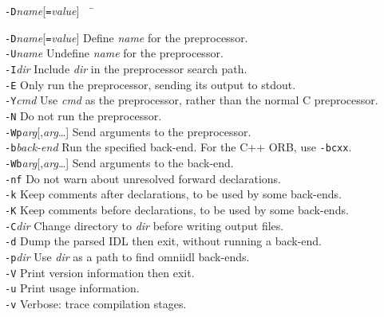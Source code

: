 \documentclass[11pt,twoside,a4paper]{book}
\newcommand{\cmdline}[1]{\texttt{#1}}
\begin{document}
\begin{tabbing}
\cmdline{-D}\textit{name}[\cmdline{=}\textit{value}]~~ \= \kill

\cmdline{-D}\textit{name}[\cmdline{=}\textit{value}]
     \> Define \textit{name} for the preprocessor.\\

\cmdline{-U}\textit{name}
     \> Undefine \textit{name} for the preprocessor.\\

\cmdline{-I}\textit{dir}
     \> Include \textit{dir} in the preprocessor search path.\\

\cmdline{-E}
     \> Only run the preprocessor, sending its output to stdout.\\

\cmdline{-Y}\textit{cmd}
     \> Use \textit{cmd} as the preprocessor, rather than the normal C
        preprocessor.\\

\cmdline{-N}
     \> Do not run the preprocessor.\\

\cmdline{-Wp}\textit{arg}[,\textit{arg}\dots]
     \> Send arguments to the preprocessor.\\

\cmdline{-b}\textit{back-end}
     \> Run the specified back-end. For the C++ ORB, use \cmdline{-bcxx}.\\

\cmdline{-Wb}\textit{arg}[,\textit{arg}\dots]
     \> Send arguments to the back-end.\\

\cmdline{-nf}
     \> Do not warn about unresolved forward declarations.\\

\cmdline{-k}
     \> Keep comments after declarations, to be used by some back-ends.\\

\cmdline{-K}
     \> Keep comments before declarations, to be used by some back-ends.\\

\cmdline{-C}\textit{dir}
     \> Change directory to \textit{dir} before writing output files.\\

\cmdline{-d}
     \> Dump the parsed IDL then exit, without running a back-end.\\

\cmdline{-p}\textit{dir}
     \> Use \textit{dir} as a path to find omniidl back-ends.\\

\cmdline{-V}
     \> Print version information then exit.\\

\cmdline{-u}
     \> Print usage information.\\

\cmdline{-v}
     \> Verbose: trace compilation stages.\\

\end{tabbing}
\end{document}
